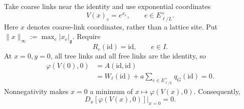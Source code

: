 \documentclass[10pt,reqno]{amsart}
\theoremstyle{definition}
\theoremstyle{remark}
\numberwithin{equation}{section}
\numberwithin{figure}{section}
\newcommand{\g}{\mathfrak g}
\begin{document}
Take coarse links near the identity and use exponential coordinates
\begin{equation}\label{eq:coarse-coordinates}
V(x)_e=e^{x_e},\qquad e\in E_{\ell/L}^+.
\end{equation}
Here $x$ denotes coarse-link coordinates, rather than a lattice site.
Put $\|x\|_\infty:=\max_e|x_e|_\g$. Require
\begin{equation}\label{eq:reference-at-identity}
R_e(\mathrm{id})=\mathrm{id},\qquad e\in I.
\end{equation}
At $x=0,y=0$, all tree links and all free links are the identity, so
\begin{equation}\label{eq:reference-energy-at-zero}
\begin{aligned}
\varphi(V(0),0)&=A(\mathrm{id},\mathrm{id})\\
&=W_\ell(\mathrm{id})
+a\sum_{e\in E_{\ell/L}^+}q_G(\mathrm{id})=0.
\end{aligned}
\end{equation}
Nonnegativity makes $x=0$ a minimum of $x\mapsto\varphi(V(x),0)$.
Consequently,
\begin{equation}\label{eq:reference-first-derivative-zero}
D_x[\varphi(V(x),0)]\big|_{x=0}=0.
\end{equation}
\end{document}
